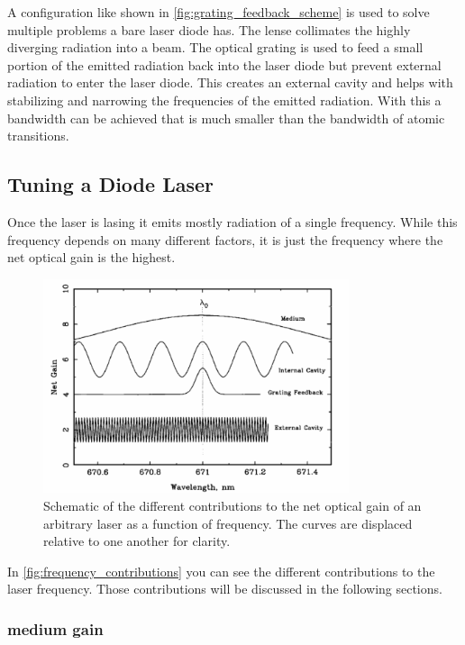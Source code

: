 A configuration like shown in \autoref{fig:grating_feedback_scheme} is used to solve multiple problems a bare laser diode has.
The lense collimates the highly diverging radiation into a beam.
The optical grating is used to feed a small portion of the emitted radiation back into the laser diode but prevent external radiation to enter the laser diode.
This creates an external cavity and helps with stabilizing and narrowing the frequencies of the emitted radiation.
With this a bandwidth can be achieved that is much smaller than the bandwidth of atomic transitions.


\subsection{Tuning a Diode Laser}
\label{ssec:laser_tuning}

Once the laser is lasing it emits mostly radiation of a single frequency.
While this frequency depends on many different factors, it is just the frequency where the net optical gain is the highest.

\begin{figure}
    \centering
    \includegraphics[width=0.8\textwidth]{images/frequency_contributions.png}
    \caption{Schematic of the different contributions to the net optical gain of an arbitrary laser as a
    function of frequency. The curves are displaced relative to one another for clarity. \cite{V60}}
    \label{fig:frequency_contributions}
\end{figure}

In \autoref{fig:frequency_contributions} you can see the different contributions to the laser frequency.
Those contributions will be discussed in the following sections.

\subsubsection{medium gain}
\label{sssec:medium_gain}


